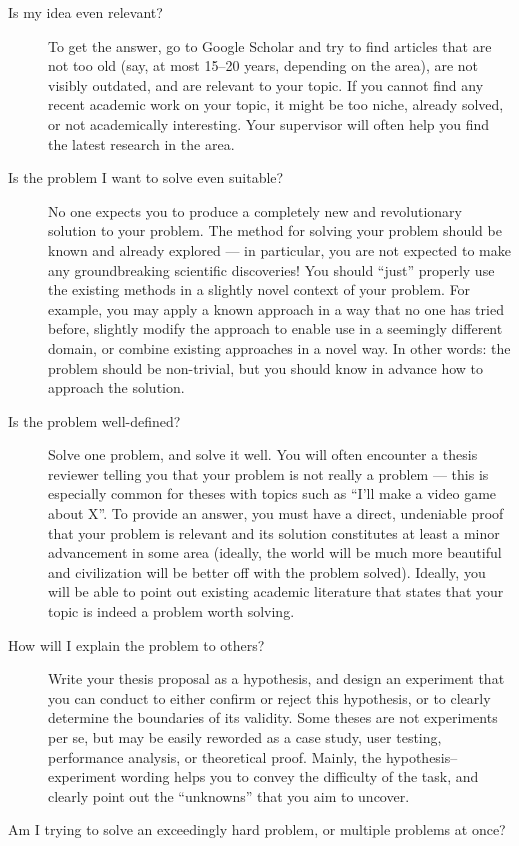 \begin{description}
\item[Is my idea even relevant?]
To get the answer, go to Google Scholar and try to find articles that are not too old (say, at most 15--20 years, depending on the area), are not visibly outdated, and are relevant to your topic. If you cannot find any recent academic work on your topic, it might be too niche, already solved, or not academically interesting. Your supervisor will often help you find the latest research in the area.
\item[Is the problem I want to solve even suitable?]
No one expects you to produce a completely new and revolutionary solution to your problem. The method for solving your problem should be known and already explored --- in particular, you are not expected to make any groundbreaking scientific discoveries! You should ``just'' properly use the existing methods in a slightly novel context of your problem. For example, you may apply a known approach in a way that no one has tried before, slightly modify the approach to enable use in a seemingly different domain, or combine existing approaches in a novel way. In other words: the problem should be non-trivial, but you should know in advance how to approach the solution.
\item[Is the problem well-defined?]
Solve one problem, and solve it well. You will often encounter a thesis reviewer telling you that your problem is not really a problem --- this is especially common for theses with topics such as ``I'll make a video game about X''. To provide an answer, you must have a direct, undeniable proof that your problem is relevant and its solution constitutes at least a minor advancement in some area (ideally, the world will be much more beautiful and civilization will be better off with the problem solved). Ideally, you will be able to point out existing academic literature that states that your topic is indeed a problem worth solving.
\item[How will I explain the problem to others?]
Write your thesis proposal as a hypothesis, and design an experiment that you can conduct to either confirm or reject this hypothesis, or to clearly determine the boundaries of its validity. Some theses are not experiments per se, but may be easily reworded as a case study, user testing, performance analysis, or theoretical proof. Mainly, the hypothesis--experiment wording helps you to convey the difficulty of the task, and clearly point out the ``unknowns'' that you aim to uncover.
\item[Am I trying to solve an exceedingly hard problem, or multiple problems at once?]

\end{description}
